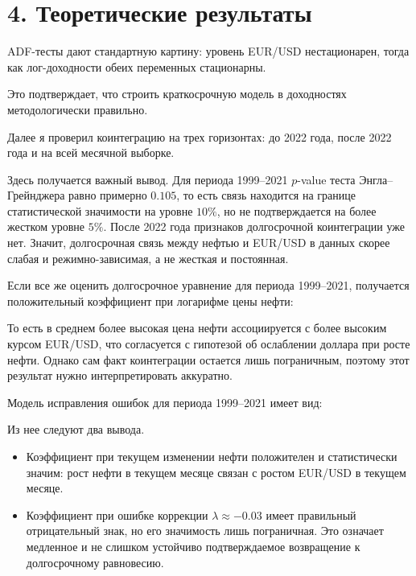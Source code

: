 \documentclass[a4paper,12pt]{article}
\begin{document}
\section*{4. Теоретические результаты}
ADF-тесты дают стандартную картину: уровень EUR/USD нестационарен, тогда как лог-доходности обеих переменных стационарны.

\begin{center}

\end{center}

Это подтверждает, что строить краткосрочную модель в доходностях методологически правильно.

Далее я проверил коинтеграцию на трех горизонтах: до 2022 года, после 2022 года и на всей месячной выборке.

\begin{center}

\end{center}

Здесь получается важный вывод. Для периода 1999--2021 $p$-value теста Энгла--Грейнджера равно примерно $0.105$, то есть связь находится на границе статистической значимости на уровне $10\%$, но не подтверждается на более жестком уровне $5\%$. После 2022 года признаков долгосрочной коинтеграции уже нет. Значит, долгосрочная связь между нефтью и EUR/USD в данных скорее слабая и режимно-зависимая, а не жесткая и постоянная.

Если все же оценить долгосрочное уравнение для периода 1999--2021, получается положительный коэффициент при логарифме цены нефти:

\begin{center}

\end{center}

То есть в среднем более высокая цена нефти ассоциируется с более высоким курсом EUR/USD, что согласуется с гипотезой об ослаблении доллара при росте нефти. Однако сам факт коинтеграции остается лишь пограничным, поэтому этот результат нужно интерпретировать аккуратно.

Модель исправления ошибок для периода 1999--2021 имеет вид:

\begin{center}

\end{center}

Из нее следуют два вывода.
\begin{itemize}
    \item Коэффициент при текущем изменении нефти положителен и статистически значим: рост нефти в текущем месяце связан с ростом EUR/USD в текущем месяце.
    \item Коэффициент при ошибке коррекции $\lambda \approx -0.03$ имеет правильный отрицательный знак, но его значимость лишь пограничная. Это означает медленное и не слишком устойчиво подтверждаемое возвращение к долгосрочному равновесию.
\end{itemize}
\end{document}
